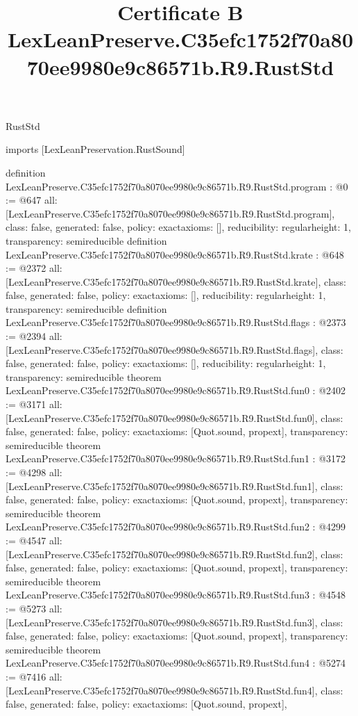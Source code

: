\begin{lexlean}{RustStd}
\title{Certificate B LexLeanPreserve.C35efc1752f70a8070ee9980e9c86571b.R9.RustStd}
\begin{coremodule}
imports [LexLeanPreservation.RustSound]

definition LexLeanPreserve.C35efc1752f70a8070ee9980e9c86571b.R9.RustStd.program : @0 := @647 {
  all: [LexLeanPreserve.C35efc1752f70a8070ee9980e9c86571b.R9.RustStd.program],
  class: false,
  generated: false,
  policy: exact{axioms: []},
  reducibility: regular{height: 1},
  transparency: semireducible
}
definition LexLeanPreserve.C35efc1752f70a8070ee9980e9c86571b.R9.RustStd.krate : @648 := @2372 {
  all: [LexLeanPreserve.C35efc1752f70a8070ee9980e9c86571b.R9.RustStd.krate],
  class: false,
  generated: false,
  policy: exact{axioms: []},
  reducibility: regular{height: 1},
  transparency: semireducible
}
definition LexLeanPreserve.C35efc1752f70a8070ee9980e9c86571b.R9.RustStd.flags : @2373 := @2394 {
  all: [LexLeanPreserve.C35efc1752f70a8070ee9980e9c86571b.R9.RustStd.flags],
  class: false,
  generated: false,
  policy: exact{axioms: []},
  reducibility: regular{height: 1},
  transparency: semireducible
}
theorem LexLeanPreserve.C35efc1752f70a8070ee9980e9c86571b.R9.RustStd.fun0 : @2402 := @3171 {
  all: [LexLeanPreserve.C35efc1752f70a8070ee9980e9c86571b.R9.RustStd.fun0],
  class: false,
  generated: false,
  policy: exact{axioms: [Quot.sound, propext]},
  transparency: semireducible
}
theorem LexLeanPreserve.C35efc1752f70a8070ee9980e9c86571b.R9.RustStd.fun1 : @3172 := @4298 {
  all: [LexLeanPreserve.C35efc1752f70a8070ee9980e9c86571b.R9.RustStd.fun1],
  class: false,
  generated: false,
  policy: exact{axioms: [Quot.sound, propext]},
  transparency: semireducible
}
theorem LexLeanPreserve.C35efc1752f70a8070ee9980e9c86571b.R9.RustStd.fun2 : @4299 := @4547 {
  all: [LexLeanPreserve.C35efc1752f70a8070ee9980e9c86571b.R9.RustStd.fun2],
  class: false,
  generated: false,
  policy: exact{axioms: [Quot.sound, propext]},
  transparency: semireducible
}
theorem LexLeanPreserve.C35efc1752f70a8070ee9980e9c86571b.R9.RustStd.fun3 : @4548 := @5273 {
  all: [LexLeanPreserve.C35efc1752f70a8070ee9980e9c86571b.R9.RustStd.fun3],
  class: false,
  generated: false,
  policy: exact{axioms: [Quot.sound, propext]},
  transparency: semireducible
}
theorem LexLeanPreserve.C35efc1752f70a8070ee9980e9c86571b.R9.RustStd.fun4 : @5274 := @7416 {
  all: [LexLeanPreserve.C35efc1752f70a8070ee9980e9c86571b.R9.RustStd.fun4],
  class: false,
  generated: false,
  policy: exact{axioms: [Quot.sound, propext]},
}
\end{coremodule}
\end{lexlean}
